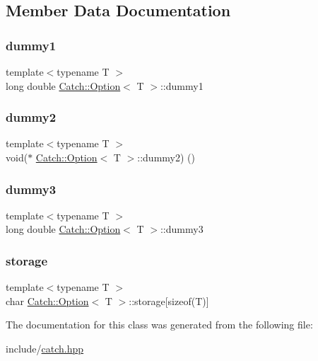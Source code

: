 \subsection{Member Data Documentation}
\mbox{\label{class_catch_1_1_option_a48ef08179923d6f943abe614999e6073}} 
\subsubsection{\texorpdfstring{dummy1}{dummy1}}
{\footnotesize\ttfamily template$<$typename T $>$ \\
long double \mbox{\hyperlink{class_catch_1_1_option}{Catch\+::\+Option}}$<$ T $>$\+::dummy1}

\mbox{\label{class_catch_1_1_option_afa73c2396b7732932a148b3c889b81d1}} 
\subsubsection{\texorpdfstring{dummy2}{dummy2}}
{\footnotesize\ttfamily template$<$typename T $>$ \\
void($\ast$ \mbox{\hyperlink{class_catch_1_1_option}{Catch\+::\+Option}}$<$ T $>$\+::dummy2) ()}

\mbox{\label{class_catch_1_1_option_a5540a84662093591be496c3a57e9da3f}} 
\subsubsection{\texorpdfstring{dummy3}{dummy3}}
{\footnotesize\ttfamily template$<$typename T $>$ \\
long double \mbox{\hyperlink{class_catch_1_1_option}{Catch\+::\+Option}}$<$ T $>$\+::dummy3}

\mbox{\label{class_catch_1_1_option_acdebca1b18bb8542c3f676b8dd805f23}} 
\subsubsection{\texorpdfstring{storage}{storage}}
{\footnotesize\ttfamily template$<$typename T $>$ \\
char \mbox{\hyperlink{class_catch_1_1_option}{Catch\+::\+Option}}$<$ T $>$\+::storage\mbox{[}sizeof(T)\mbox{]}}



The documentation for this class was generated from the following file\+:\begin{DoxyCompactItemize}
\item 
include/\mbox{\hyperlink{catch_8hpp}{catch.\+hpp}}\end{DoxyCompactItemize}
